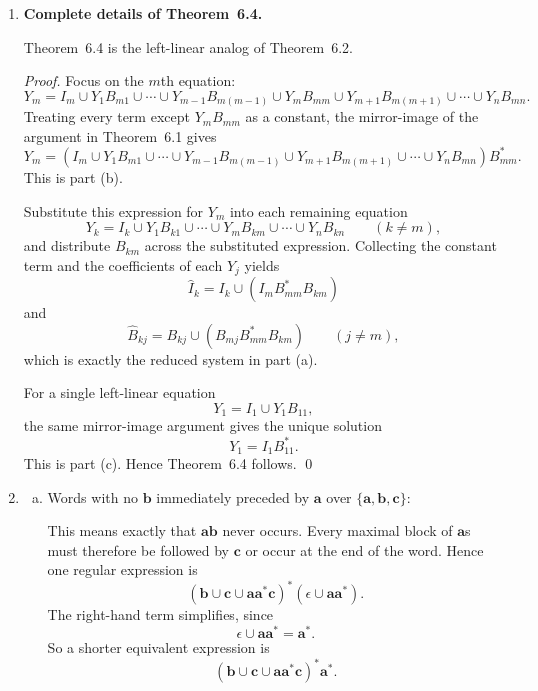 \begin{enumerate}[{6.}1.]
\begin{enumerate}[(a)]
  \item Since every FAD language has a regular expression (Corollary~6.2), and
  the reversal of any regular expression (via the rules above) is also a
  regular expression, $\RSIG$ is closed under $r$.
\end{enumerate}

\item \textbf{Complete details of Theorem~6.4.}

Theorem~6.4 is the left-linear analog of Theorem~6.2.

\begin{proof}
Focus on the $m$th equation:
\[
  Y_m=I_m\cup Y_1B_{m1}\cup\cdots\cup Y_{m-1}B_{m(m-1)}\cup Y_mB_{mm}
      \cup Y_{m+1}B_{m(m+1)}\cup\cdots\cup Y_nB_{mn}.
\]
Treating every term except $Y_mB_{mm}$ as a constant, the mirror-image of the
argument in Theorem~6.1 gives
\[
  Y_m=
  (I_m\cup Y_1B_{m1}\cup\cdots\cup Y_{m-1}B_{m(m-1)}
  \cup Y_{m+1}B_{m(m+1)}\cup\cdots\cup Y_nB_{mn})B_{mm}^*.
\]
This is part (b).

Substitute this expression for $Y_m$ into each remaining equation
\[
  Y_k=I_k\cup Y_1B_{k1}\cup\cdots\cup Y_mB_{km}\cup\cdots\cup Y_nB_{kn}
  \qquad (k\ne m),
\]
and distribute $B_{km}$ across the substituted expression.  Collecting the
constant term and the coefficients of each $Y_j$ yields
\[
  \hat{I}_k=I_k\cup(I_mB_{mm}^*B_{km})
\]
and
\[
  \hat{B}_{kj}=B_{kj}\cup(B_{mj}B_{mm}^*B_{km})
  \qquad (j\ne m),
\]
which is exactly the reduced system in part (a).

For a single left-linear equation
\[
  Y_1=I_1\cup Y_1B_{11},
\]
the same mirror-image argument gives the unique solution
\[
  Y_1=I_1B_{11}^*.
\]
This is part (c).  Hence Theorem~6.4 follows. \qed
\end{proof}

\item \begin{enumerate}[(a)]
  \item Words with no $\pmb{b}$ immediately preceded by $\pmb{a}$ over $\{\pmb{a},\pmb{b},\pmb{c}\}$:

  This means exactly that $\pmb{ab}$ never occurs.  Every maximal block of
  $\pmb{a}$s must therefore be followed by $\pmb{c}$ or occur at the end of the
  word.  Hence one regular expression is
  \[
    (\pmb{b}\cup\pmb{c}\cup\pmb{a}\pmb{a}^*\pmb{c})^*(\epsilon\cup\pmb{a}\pmb{a}^*).
  \]
  The right-hand term simplifies, since
  \[
    \epsilon\cup\pmb{a}\pmb{a}^*=\pmb{a}^*.
  \]
  So a shorter equivalent expression is
  \[
    (\pmb{b}\cup\pmb{c}\cup\pmb{a}\pmb{a}^*\pmb{c})^*\pmb{a}^*.
  \]


\end{enumerate}
\end{enumerate}

